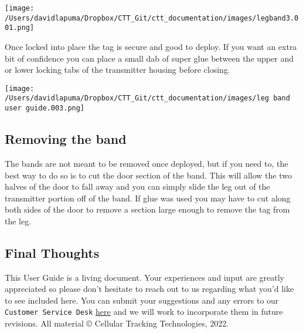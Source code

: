 \documentclass[
]{article}
\begin{document}
\texttt{[image: /Users/davidlapuma/Dropbox/CTT\_Git/ctt\_documentation/images/legband3.001.png]}

Once locked into place the tag is secure and good to deploy. If you want
an extra bit of confidence you can place a small dab of super glue
between the upper and or lower locking tabs of the transmitter housing
before closing.

\texttt{[image: /Users/davidlapuma/Dropbox/CTT\_Git/ctt\_documentation/images/leg band user guide.003.png]}

\hypertarget{removing-the-band}{%
\subsection{Removing the band}\label{removing-the-band}}

The bands are not meant to be removed once deployed, but if you need to,
the best way to do so is to cut the door section of the band. This will
allow the two halves of the door to fall away and you can simply slide
the leg out of the transmitter portion off of the band. If glue was used
you may have to cut along both sides of the door to remove a section
large enough to remove the tag from the leg.

\hypertarget{final-thoughts}{%
\subsection{Final Thoughts}\label{final-thoughts}}

This User Guide is a living document. Your experiences and input are
greatly appreciated so please don't hesitate to reach out to us
regarding what you'd like to see included here. You can submit your
suggestions and any errors to our \texttt{Customer\ Service\ Desk}
\href{https://celltracktech.com/support-customer-service-desk/}{here}
and we will work to incorporate them in future revisions. All material ©
Cellular Tracking Technologies, 2022.
\end{document}
